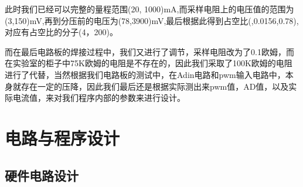 \documentclass{../source/zjureport}
\begin{document}
        此时我们已经可以完整的量程范围(20, 1000)mA,而采样电阻上的电压值的范围为(3,150)mV,再到分压前的电压为(78,3900)mV,最后根据此得到占空比(,0.0156,0.78),对应有占空比的分子(4，200)。
  
        而在最后电路板的焊接过程中，我们又进行了调节，采样电阻改为了0.1欧姆，而在实验室的柜子中75K欧姆的电阻是不存在的，因此我们采取了100K欧姆的电阻进行了代替，当然根据我们电路板的测试中，在Adin电路和pwm输入电路中，本身就存在一定的压降，因此我们最后还是根据实际测出来pwm值，AD值，以及实际电流值，来对我们程序内部的参数来进行设计。
        \newpage

    \section{电路与程序设计}
        \subsection{硬件电路设计}
\end{document}
